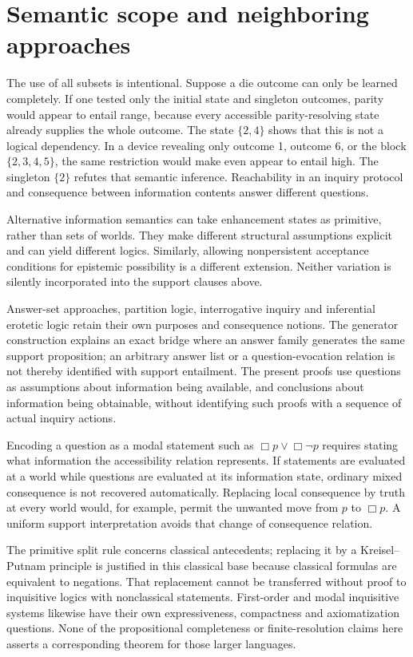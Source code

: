 \section{Semantic scope and neighboring approaches}

The use of all subsets is intentional. Suppose a die outcome can only be
learned completely. If one tested only the initial state and singleton
outcomes, parity would appear to entail range, because every accessible
parity-resolving state already supplies the whole outcome. The state
\(\{2,4\}\) shows that this is not a logical dependency. In a device
revealing only outcome 1, outcome 6, or the block \(\{2,3,4,5\}\), the
same restriction would make even appear to entail high. The singleton
\(\{2\}\) refutes that semantic inference. Reachability in an inquiry
protocol and consequence between information contents answer different questions.

Alternative information semantics can take enhancement states as primitive,
rather than sets of worlds. They make different structural assumptions
explicit and can yield different logics. Similarly, allowing nonpersistent
acceptance conditions for epistemic possibility is a different extension.
Neither variation is silently incorporated into the support clauses above.

Answer-set approaches, partition logic, interrogative inquiry and inferential
erotetic logic retain their own purposes and consequence notions. The generator
construction explains an exact bridge where an answer family generates the
same support proposition; an arbitrary answer list or a question-evocation
relation is not thereby identified with support entailment. The present
proofs use questions as assumptions about information being available,
and conclusions about information being obtainable, without identifying
such proofs with a sequence of actual inquiry actions.

Encoding a question as a modal statement such as \(\Box p\lor\Box\neg p\)
requires stating what information the accessibility relation represents.
If statements are evaluated at a world while questions are evaluated at its
information state, ordinary mixed consequence is not recovered automatically.
Replacing local consequence by truth at every world would, for example,
permit the unwanted move from \(p\) to \(\Box p\). A uniform support
interpretation avoids that change of consequence relation.

The primitive split rule concerns classical antecedents; replacing it by
a Kreisel--Putnam principle is justified in this classical base because
classical formulas are equivalent to negations. That replacement cannot
be transferred without proof to inquisitive logics with nonclassical
statements. First-order and modal inquisitive systems likewise have their
own expressiveness, compactness and axiomatization questions. None of the
propositional completeness or finite-resolution claims here asserts a
corresponding theorem for those larger languages.

